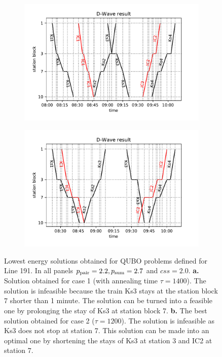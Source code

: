 \begin{figure}
  \begin{subfigure}[b]{0.5\textwidth}
    \caption{}\label{fig:dwtd1large}
    \includegraphics[width=\textwidth]{figures/sol_case1_DWave_1400_2_250k}
  \end{subfigure}
  \begin{subfigure}[b]{0.5\textwidth}
    \caption{}\label{fig:dwtd2large}
    \includegraphics[width=\textwidth]{figures/sol_case2_DWave_1200_2_250k}
  \end{subfigure}
  \caption{
    Lowest energy solutions obtained for QUBO problems defined for Line 191. In all
    panels $p_{\text{pair}} = 2.2, p_{\text{sum}} = 2.7$ and $css=2.0$. \textbf{a.} Solution obtained
    for case 1 (with annealing time $\tau=1400$). The solution is infeasible
    because the train Ks3 stays at the station block 7 shorter than 1 minute. The
    solution can be turned into a feasible one by prolonging the stay of Ks3 at
    station block 7. \textbf{b.} The best solution obtained for case 2
    ($\tau=1200$). The solution is infeasible as Ks3 does not stop at station 7.
    This solution can be made into an optimal one by shortening the stays of Ks3 at
    station 3 and IC2 at station 7. } \label{fig:dwtrainsoldlarge}
\end{figure}

